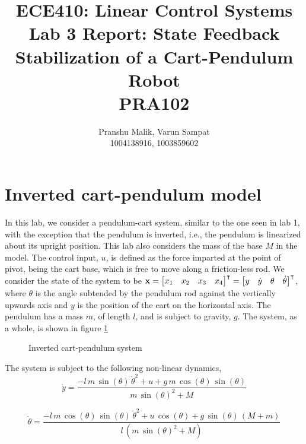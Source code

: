 \documentclass[10pt]{article}
\date{}
\begin{document}
\title{\textbf{\Large{\textsc{ECE410:} Linear Control Systems}} \\ \Large{Lab 3 Report: State Feedback Stabilization of a Cart-Pendulum Robot} \\ \textbf{\small{PRA102}}\vspace{-0.3cm}}
\author{Pranshu Malik, Varun Sampat \\ \footnotesize{1004138916}, \footnotesize{1003859602}\vspace{-3cm}}

\maketitle

\section{Inverted cart-pendulum model}
In this lab, we consider a pendulum-cart system, similar to the one seen in lab 1, with the exception that the pendulum is inverted, i.e., the pendulum is linearized about its upright position. This lab also considers the mass of the base $M$ in the model. The control input, $u$, is defined as the force imparted at the point of pivot, being the cart base, which is free to move along a friction-less rod. We consider the state of the system to be $\mathbf{x} = \begin{bmatrix} x_1 & x_2 & x_3 & x_4 \end{bmatrix}^\intercal = \begin{bmatrix} y & \dot{y} & \theta & \dot{\theta} \end{bmatrix}^\intercal$, where $\theta$ is the angle subtended by the pendulum rod against the vertically upwards axis and $y$ is the position of the cart on the horizontal axis. The pendulum has a mass $m$, of length $l$, and is subject to gravity, $g$. The system, as a whole, is shown in figure \ref{fig:inverted_pend}

\begin{figure}[!h]
\centering
\invertedpendcart
\caption{Inverted cart-pendulum system}
\label{fig:inverted_pend}
\end{figure}

The system is subject to the following non-linear dynamics,
\begin{equation} \label{eqn_y_dot}
    \dot{y} = \frac{-l\,m\,\sin\left(\theta\right)\,{\dot{\theta}}^2+u+g\,m\,\cos\left(\theta\right)\,\sin\left(\theta\right)}{m\,{\sin\left(\theta\right)}^2+M}
\end{equation}

\begin{equation} \label{eqn_theta_dot}
    \dot{\theta} = \frac{-l\,m\,\cos\left(\theta\right)\,\sin\left(\theta\right)\,{\dot{\theta}}^2+u\,\cos\left(\theta\right)+g\,\sin\left(\theta\right)\,\left(M+m\right)}{l\,\left(m\,{\sin\left(\theta\right)}^2+M\right)}
\end{equation}
\end{document}
